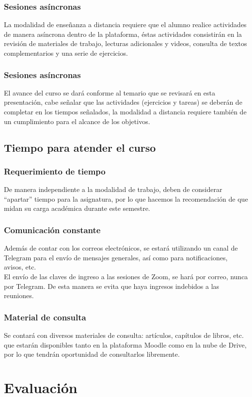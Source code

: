 \begin{frame}
\frametitle{Sesiones asíncronas}
La modalidad de enseñanza a distancia requiere que el alumno realice actividades de manera asíncrona dentro de la plataforma, éstas actividades consistirán en la revisión de materiales de trabajo, lecturas adicionales y videos, consulta de textos complementarios y una serie de ejercicios.
\end{frame}
\begin{frame}
\frametitle{Sesiones asíncronas}
El avance del curso se dará conforme al temario que se revisará en esta presentación, cabe señalar que las actividades (ejercicios y tareas) se deberán de completar en los tiempos señalados, la modalidad a distancia requiere también de un cumplimiento para el alcance de los objetivos.
\end{frame}
{

}
\subsection{Tiempo para atender el curso}
\begin{frame}
\frametitle{Requerimiento de tiempo}
De manera independiente a la modalidad de trabajo, deben de considerar \enquote{apartar} tiempo para la asignatura, por lo que hacemos la recomendación de que midan su carga académica durante este semestre.
\end{frame}
\begin{frame}
\frametitle{Comunicación constante}
Además de contar con los correos electrónicos, se estará utilizando un canal de Telegram para el envío de mensajes generales, así como para notificaciones, avisos, etc.
\\
\bigskip
\pause
El envío de las claves de ingreso a las sesiones de Zoom, se hará por correo, nunca por Telegram. De esta manera se evita que haya ingresos indebidos a las reuniones.
\end{frame}
\begin{frame}
\frametitle{Material de consulta}
Se contará con diversos materiales de consulta: artículos, capítulos de libros, etc. que estarán disponibles tanto en la plataforma Moodle como en la nube de Drive, por lo que tendrán oportunidad de consultarlos libremente.
\end{frame}

\section{Evaluación}


